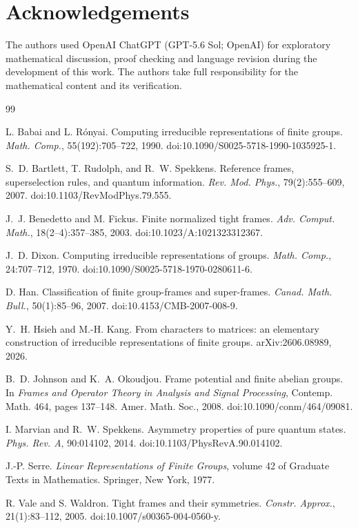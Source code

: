 \documentclass{amsart}
\theoremstyle{remark}
\begin{document}
\section*{Acknowledgements}
The authors used OpenAI ChatGPT (GPT-5.6 Sol; OpenAI) for exploratory mathematical discussion, proof
checking and language revision during the development of this work.  The authors take full responsibility
for the mathematical content and its verification.
 
\begin{thebibliography}{99}
 
L. Babai and L. R\'onyai.
\newblock Computing irreducible representations of finite groups.
\newblock \emph{Math. Comp.}, 55(192):705--722, 1990.
\newblock doi:10.1090/S0025-5718-1990-1035925-1.
 
S.~D. Bartlett, T. Rudolph, and R.~W. Spekkens.
\newblock Reference frames, superselection rules, and quantum information.
\newblock \emph{Rev. Mod. Phys.}, 79(2):555--609, 2007.
\newblock doi:10.1103/RevModPhys.79.555.
 
J.~J. Benedetto and M. Fickus.
\newblock Finite normalized tight frames.
\newblock \emph{Adv. Comput. Math.}, 18(2--4):357--385, 2003.
\newblock doi:10.1023/A:1021323312367.
 
 
J.~D. Dixon.
\newblock Computing irreducible representations of groups.
\newblock \emph{Math. Comp.}, 24:707--712, 1970.
\newblock doi:10.1090/S0025-5718-1970-0280611-6.
 
D. Han.
\newblock Classification of finite group-frames and super-frames.
\newblock \emph{Canad. Math. Bull.}, 50(1):85--96, 2007.
\newblock doi:10.4153/CMB-2007-008-9.
 
Y.~H. Hsieh and M.-H. Kang.
\newblock From characters to matrices: an elementary construction of irreducible representations of
finite groups.
\newblock arXiv:2606.08989, 2026.
 
B.~D. Johnson and K.~A. Okoudjou.
\newblock Frame potential and finite abelian groups.
\newblock In \emph{Frames and Operator Theory in Analysis and Signal Processing},
Contemp. Math. 464, pages 137--148. Amer. Math. Soc., 2008.
\newblock doi:10.1090/conm/464/09081.
 
I. Marvian and R.~W. Spekkens.
\newblock Asymmetry properties of pure quantum states.
\newblock \emph{Phys. Rev. A}, 90:014102, 2014.
\newblock doi:10.1103/PhysRevA.90.014102.
 
J.-P. Serre.
\newblock \emph{Linear Representations of Finite Groups}, volume 42 of Graduate Texts in Mathematics.
\newblock Springer, New York, 1977.
 
R. Vale and S. Waldron.
\newblock Tight frames and their symmetries.
\newblock \emph{Constr. Approx.}, 21(1):83--112, 2005.
\newblock doi:10.1007/s00365-004-0560-y.
 
\end{thebibliography}
 
\end{document}
